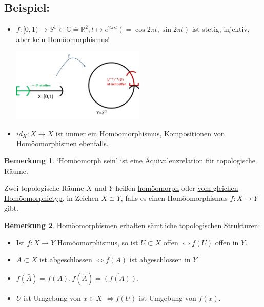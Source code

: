 \documentclass[a4paper,11pt,notitlepage]{report}
\theoremstyle{definition}
\newtheorem{remark}{Bemerkung}[chapter]
\newcommand{\R}{{\ensuremath{\mathbb{R}}}}
\newcommand{\C}{{\ensuremath{\mathbb{C}}}}
\newenvironment{bsp}[1]
{
\setlength{\fboxsep}{10pt}
\subsection*{Beispiel: #1}
\begin{upshape}
}
{
\end{upshape}
}
\newenvironment{definition}[1]{
	\begin{definitions}
	\marginnote{\emph{#1}}
}{\end{definitions}}
\begin{document}
\begin{bsp}{}
	\begin{itemize}
		\item $f \colon [0,1) \rightarrow S^1 \subset \C \hat{=} \R^2, t \mapsto e^{2 \pi i t} (= \cos {2 \pi t}, \sin {2 \pi t})$ ist stetig, injektiv, aber \underline{kein} Homöomorphismus!
		\begin{center}
		\includegraphics[width=0.5\textwidth]{images/0_1_nach_S1_f-1_nicht_stetig.jpg}
		\end{center}
		\item $id_X \colon X \rightarrow X$ ist immer ein Homöomorphismus, Kompositionen von Homöomorphismen ebenfalls.
	\end{itemize}
\end{bsp}

\begin{remark}
	`Homöomorph sein' ist eine Äquivalenzrelation für topologische Räume.
\end{remark}

\begin{definition}{homöomorph}
	Zwei topologische Räume $X$ und $Y$ heißen \underline{homöomorph} oder \underline{vom gleichen Homöomorphietyp}, in Zeichen $X \cong Y$, falls es einen Homöomorphismus $f \colon X \rightarrow Y$ gibt.
\end{definition}

\begin{remark}
	Homöomorphismen erhalten sämtliche topologischen Strukturen:
	\begin{itemize}
		\item Ist $f \colon X \rightarrow Y$ Homöomorphismus, so ist $U \subset X$ offen $\Leftrightarrow f(U)$ offen in $Y$.
		\item $A \subset X$ ist abgeschlossen $\Leftrightarrow f(A)$ ist abgeschlossen in $Y$.
		\item $f(\bar{A}) = \overline{f(A)}, f(\mathring A) = \mathring{\left(f(A)\right)}$.
		\item $U$ ist Umgebung von $x \in X$ $\Leftrightarrow f(U)$ ist Umgebung von $f(x)$.
	\end{itemize}
\end{remark}
\end{document}
